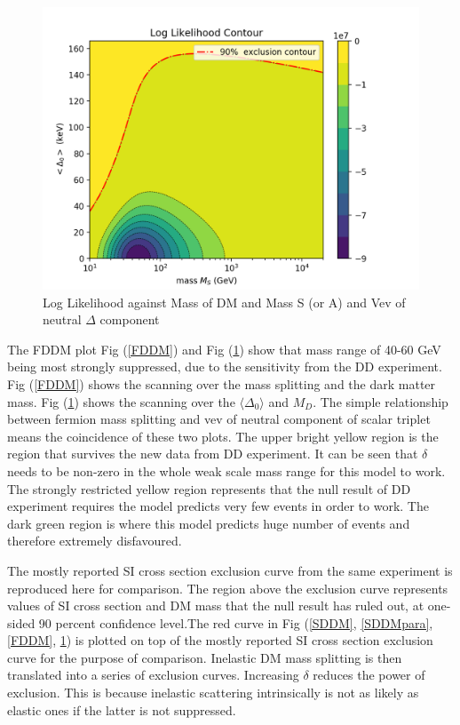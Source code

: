 \documentclass[12pt]{article}
\begin{document}
\begin{figure}
\includegraphics{figure_4.png}
\caption{Log Likelihood against Mass of DM and Mass S (or A) and Vev of neutral $\Delta$ component} \label{FDDMpara}
\end{figure}




The FDDM plot Fig (\ref{FDDM}) and Fig (\ref{FDDMpara}) show that mass range of 40-60 GeV being most strongly suppressed, due to the sensitivity from the DD experiment. Fig (\ref{FDDM}) shows the scanning over the mass splitting and the dark matter mass.  Fig (\ref{FDDMpara}) shows the scanning over the $\langle \Delta_0 \rangle$ and $M_D$. The simple relationship between fermion mass splitting and vev of neutral component of scalar triplet means the coincidence of these two plots. The upper bright yellow region is the region that survives the new data from DD experiment. It can be seen that $\delta$ needs to be non-zero in the whole weak scale mass range for this model to work. The strongly restricted yellow region represents that the null result of DD experiment requires the model predicts very few events in order to work. The dark green region is where this model predicts huge number of events and therefore extremely disfavoured. 


The mostly reported SI cross section exclusion curve from the same experiment is reproduced here for comparison. The region above the exclusion curve represents values of SI cross section and DM mass that the null result has ruled out, at one-sided 90 percent confidence level.The red curve in Fig (\ref{SDDM}, \ref{SDDMpara}, \ref{FDDM}, \ref{FDDMpara}) is plotted on top of the mostly reported SI cross section exclusion curve for the purpose of comparison. Inelastic DM mass splitting is then translated into a series of exclusion curves. Increasing $\delta$ reduces the power of exclusion. This is because inelastic scattering intrinsically is not as likely as elastic ones if the latter is not suppressed. 
\end{document}
